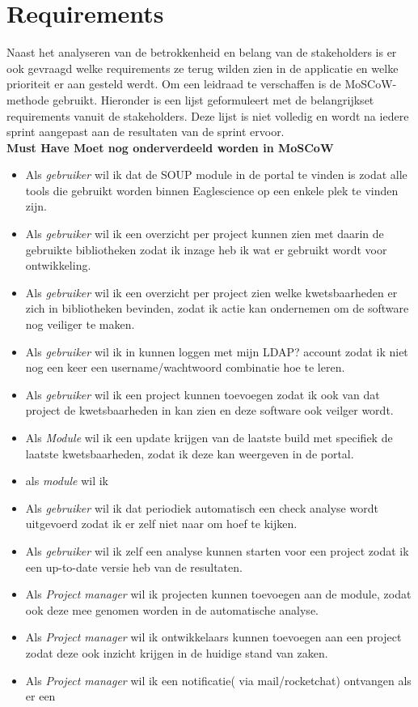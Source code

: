 \section{Requirements}
Naast het analyseren van de betrokkenheid en belang van de stakeholders is er ook gevraagd welke requirements ze terug wilden zien in de applicatie en welke prioriteit er aan gesteld werdt. Om een leidraad te verschaffen is de MoSCoW-methode gebruikt. Hieronder is een lijst geformuleert met de belangrijkset requirements vanuit de stakeholders. Deze lijst is niet volledig en wordt na iedere sprint aangepast aan de resultaten van de sprint ervoor.\\

\textbf{Must Have Moet nog onderverdeeld worden in MoSCoW}
\begin{itemize}
  \item Als \textit{gebruiker} wil ik dat de SOUP module in de portal te vinden is zodat alle tools die gebruikt worden binnen Eaglescience op een enkele plek te vinden zijn.
  \item Als \textit{gebruiker} wil ik een overzicht per project kunnen zien met daarin de gebruikte bibliotheken zodat ik inzage heb ik wat er gebruikt wordt voor ontwikkeling.
  \item Als \textit{gebruiker} wil ik een overzicht per project zien welke kwetsbaarheden er zich in bibliotheken bevinden, zodat ik actie kan ondernemen om de software nog veiliger te maken.
  \item Als \textit{gebruiker} wil ik in kunnen loggen met mijn LDAP? account zodat ik niet nog een keer een username/wachtwoord combinatie hoe te leren.
  \item Als \textit{gebruiker} wil ik een project kunnen toevoegen zodat ik ook van dat project de kwetsbaarheden in kan zien en deze software ook veilger wordt.
  \item Als \textit{Module} wil ik een update krijgen van de laatste build met specifiek de laatste kwetsbaarheden, zodat ik deze kan weergeven in de portal.
  \item als \textit{module} wil ik  
  \item Als \textit{gebruiker} wil ik dat periodiek automatisch een check analyse wordt uitgevoerd zodat ik er zelf niet naar om hoef te kijken.
  \item Als \textit{gebruiker} wil ik zelf een analyse kunnen starten voor een project zodat ik een up-to-date versie heb van de resultaten.
  \item Als \textit{Project manager} wil ik projecten kunnen toevoegen aan de module, zodat ook deze mee genomen worden in de automatische analyse.
  \item Als \textit{Project manager} wil ik ontwikkelaars kunnen toevoegen aan een project zodat deze ook inzicht krijgen in de huidige stand van zaken.
  \item Als \textit{Project manager} wil ik een notificatie( via mail/rocketchat) ontvangen als er een
\end{itemize}

